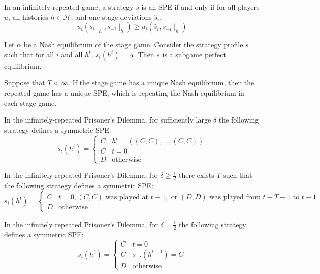 \documentclass[10pt]{article}
\begin{document}
\begin{theorem}
	In an infinitely repeated game, a strategy $s$ is an SPE if and only if for all players $u$, all histories $h \in \mathcal{H}$, and one-stage deviations $\hat{s}_i$,\[u_i(s_i\mid_h , s_{-i} \mid_h) \ge u_i(\hat{s}_i,s_{-i}\mid_h)\]
\end{theorem}

\begin{proposition}
	Let $\alpha$ be a Nash equilibrium of the stage game. Consider the strategy profile $s$ such that for all $i$ and all $h^t$, $s_i(h^t) = \alpha$. Then $s$ is a subgame perfect equilibrium.
\end{proposition}

\begin{proposition}
	Suppose that $T < \infty$. If the stage game has a unique Nash equilibrium, then the repeated game has a unique SPE, which is repeating the Nash equilibrium in each stage game.
\end{proposition}

\begin{proposition}
	In the infinitely-repeated Prisoner's Dilemma, for sufficiently large $\delta$ the following strategy defines a symmetric SPE:\[s_i(h^t) = \begin{cases} C & h^t = ((C,C),\dots,(C,C))\\ C & t = 0 \\ D & \text{otherwise}\end{cases}\]
\end{proposition}
\begin{proposition}
	In the infinitely-repeated Prisoner's Dilemma, for $\delta \ge \frac{1}{2}$ there exists $T$ such that the following strategy defines a symmetric SPE:\[s_i(h^t) = \begin{cases} C & t = 0, (C,C) \text{ was played at } t-1, \text{ or } (D,D) \text{ was played from } t-T-1 \text{ to } t-1 \\ D & \text{otherwise}\end{cases}\]
\end{proposition}
\begin{proposition}
	In the infinitely repeated Prisoner's Dilemma, for $\delta = \frac{1}{2}$ the following strategy defines a symmetric SPE: \[s_i(h^t) = \begin{cases} C & t = 0 \\ C & s_{-i}(h^{t-1}) = C \\ D & \text{otherwise} \end{cases}\]
\end{proposition}
\end{document}
